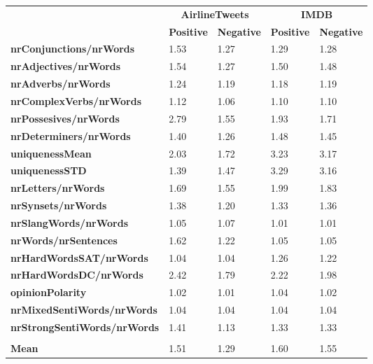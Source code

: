\begin{tabular}{|l|l|l|l|l|} \cline{2-5}
\multicolumn{1}{c|}{} & \multicolumn{2}{c|}{\textbf{AirlineTweets}} & \multicolumn{2}{c|}{\textbf{IMDB}}\\ \cline{2-5}
\multicolumn{1}{c|}{} & \textbf{Positive} & \textbf{Negative} & \textbf{Positive} & \textbf{Negative} \\ \hline
\textbf{nrConjunctions/nrWords} & 1.53 & 1.27 & 1.29 & 1.28 \\ \hline
\textbf{nrAdjectives/nrWords} & 1.54 & 1.27 & 1.50 & 1.48 \\ \hline
\textbf{nrAdverbs/nrWords} & 1.24 & 1.19 & 1.18 & 1.19 \\ \hline
\textbf{nrComplexVerbs/nrWords} & 1.12 & 1.06 & 1.10 & 1.10 \\ \hline
\textbf{nrPossesives/nrWords} & 2.79 & 1.55 & 1.93 & 1.71 \\ \hline
\textbf{nrDeterminers/nrWords} & 1.40 & 1.26 & 1.48 & 1.45 \\ \hline
\textbf{uniquenessMean} & 2.03 & 1.72 & 3.23 & 3.17 \\ \hline
\textbf{uniquenessSTD} & 1.39 & 1.47 & 3.29 & 3.16 \\ \hline
\textbf{nrLetters/nrWords} & 1.69 & 1.55 & 1.99 & 1.83 \\ \hline
\textbf{nrSynsets/nrWords} & 1.38 & 1.20 & 1.33 & 1.36 \\ \hline
\textbf{nrSlangWords/nrWords} & 1.05 & 1.07 & 1.01 & 1.01 \\ \hline
\textbf{nrWords/nrSentences} & 1.62 & 1.22 & 1.05 & 1.05 \\ \hline
\textbf{nrHardWordsSAT/nrWords} & 1.04 & 1.04 & 1.26 & 1.22 \\ \hline
\textbf{nrHardWordsDC/nrWords} & 2.42 & 1.79 & 2.22 & 1.98 \\ \hline
\textbf{opinionPolarity} & 1.02 & 1.01 & 1.04 & 1.02 \\ \hline
\textbf{nrMixedSentiWords/nrWords} & 1.04 & 1.04 & 1.04 & 1.04 \\ \hline
\textbf{nrStrongSentiWords/nrWords} & 1.41 & 1.13 & 1.33 & 1.33\\ \hline
 \multicolumn{3}{c}{} \\ [-1.5ex] \hline
\textbf{Mean} & 1.51 & 1.29 & 1.60 & 1.55 \\ \hline
\end{tabular}